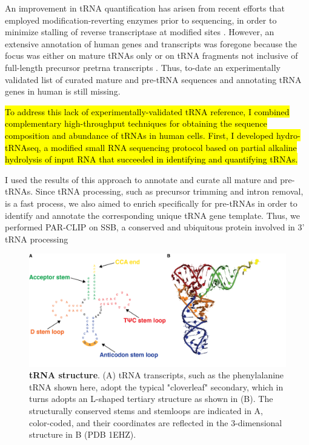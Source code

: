 \documentclass[12pt]{rockefeller}
\begin{document}
An improvement in tRNA quantification has arisen from recent efforts that employed modification-reverting enzymes prior to sequencing, in order to minimize stalling of reverse transcriptase at modified sites \cite{Cozen:2015ds, Zheng:2015dw}. However, an extensive annotation of human genes and transcripts was foregone because the focus was either on mature tRNAs only \cite{Zheng:2015dw} or on tRNA fragments not inclusive of full-length precursor \gls{pretrna} transcripts \cite{Cozen:2015ds}. Thus, to-date an experimentally validated list of curated mature and pre-tRNA sequences and annotating tRNA genes in human is still missing.

\hl{To address this lack of experimentally-validated tRNA reference, I combined complementary high-throughput techniques for obtaining the sequence composition and abundance of tRNAs in human cells. First, I developed hydro-tRNAseq, a modified small RNA sequencing protocol based on partial alkaline hydrolysis of input RNA that succeeded in identifying and quantifying tRNAs.}

I used the results of this approach to annotate and curate all mature and pre-tRNAs. Since tRNA processing, such as precursor trimming and intron removal, is a fast process\cite{Foretek:2016ea}, we also aimed to enrich specifically for pre-tRNAs in order to identify and annotate the corresponding unique tRNA gene template. Thus, we performed PAR-CLIP on SSB, a conserved and ubiquitous protein involved in 3’ tRNA processing \cite{Bayfield:2009cx,Bayfield:2010cs,Stefano:1984wp}

\begin{figure}[!ht]%
\centering
\includegraphics[width=\textwidth]{tRNA_general_structure.png}%
\caption[tRNA structure]{\textbf{tRNA structure}. (A) tRNA transcripts, such as the phenylalanine tRNA shown here, adopt the typical "cloverleaf" secondary, which in turns adopts an L-shaped tertiary structure as shown in (B). The structurally conserved stems and stemloops are indicated in A, color-coded, and their coordinates are reflected in the 3-dimensional structure in B (PDB 1EHZ).
}
\label{tRNAstructure}%
\end{figure}
\end{document}
